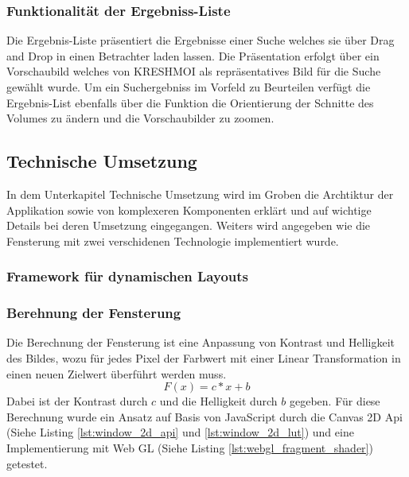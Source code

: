 \subsubsection{Funktionalität der Ergebniss-Liste}
\label{sec:Funktionalität der Ergebniss-Liste}
Die Ergebnis-Liste präsentiert die Ergebnisse einer Suche welches sie über Drag and Drop in einen Betrachter laden lassen.
Die Präsentation erfolgt über ein Vorschaubild welches von KRESHMOI als repräsentatives Bild für die Suche gewählt wurde.
Um ein Suchergebniss im Vorfeld zu Beurteilen verfügt die Ergebnis-List ebenfalls über die Funktion die Orientierung der Schnitte des Volumes zu ändern und die Vorschaubilder zu zoomen.

\subsection{Technische Umsetzung}
\label{sec:Technische Umsetzung}
In dem Unterkapitel Technische Umsetzung wird im Groben die Archtiktur der Applikation sowie von komplexeren Komponenten erklärt und auf wichtige Details bei deren Umsetzung eingegangen.
Weiters wird angegeben wie die Fensterung mit zwei verschidenen Technologie implementiert wurde.

\subsubsection{Framework für dynamischen Layouts}
\label{sec:Umsetzung der dynamischen Layouts}

\subsubsection{Berehnung der Fensterung}
\label{sec:Berehnung der Fensterung}
Die Berechnung der Fensterung ist eine Anpassung von Kontrast und Helligkeit des Bildes,
wozu für jedes Pixel der Farbwert mit einer Linear Transformation in einen neuen Zielwert überführt werden muss.
\begin{equation}
        F(x) = c*x + b
\end{equation}
Dabei ist der Kontrast durch $c$ und die Helligkeit durch $b$ gegeben.
Für diese Berechnung wurde ein Ansatz auf Basis von JavaScript durch die Canvas 2D Api (Siehe Listing \ref{lst:window_2d_api} und \ref{lst:window_2d_lut}) und eine Implementierung mit Web GL (Siehe Listing \ref{lst:webgl_fragment_shader}) getestet.

